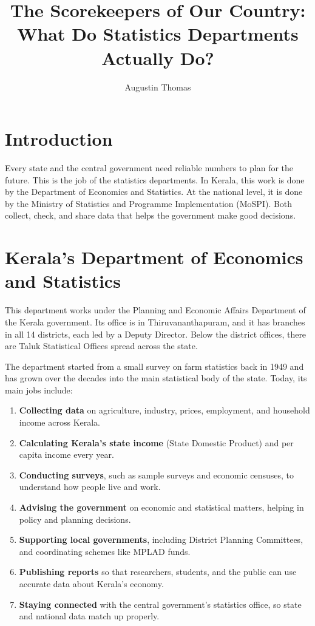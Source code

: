 \documentclass[12pt]{article}
\title{\textbf{\LARGE The Scorekeepers of Our Country:\\ \large What Do Statistics Departments Actually Do?}}
\author{Augustin Thomas}
\date{}
\begin{document}
 
\maketitle
 
\section*{Introduction}
Every state and the central government need reliable numbers to plan for the future. This is the job of the statistics departments. In Kerala, this work is done by the Department of Economics and Statistics. At the national level, it is done by the Ministry of Statistics and Programme Implementation (MoSPI). Both collect, check, and share data that helps the government make good decisions.
 
\section*{Kerala's Department of Economics and Statistics}
This department works under the Planning and Economic Affairs Department of the Kerala government. Its office is in Thiruvananthapuram, and it has branches in all 14 districts, each led by a Deputy Director. Below the district offices, there are Taluk Statistical Offices spread across the state.
 
The department started from a small survey on farm statistics back in 1949 and has grown over the decades into the main statistical body of the state. Today, its main jobs include:
 
\begin{enumerate}[leftmargin=*]
    \item \textbf{Collecting data} on agriculture, industry, prices, employment, and household income across Kerala.
    \item \textbf{Calculating Kerala's state income} (State Domestic Product) and per capita income every year.
    \item \textbf{Conducting surveys}, such as sample surveys and economic censuses, to understand how people live and work.
    \item \textbf{Advising the government} on economic and statistical matters, helping in policy and planning decisions.
    \item \textbf{Supporting local governments}, including District Planning Committees, and coordinating schemes like MPLAD funds.
    \item \textbf{Publishing reports} so that researchers, students, and the public can use accurate data about Kerala's economy.
    \item \textbf{Staying connected} with the central government's statistics office, so state and national data match up properly.
\end{enumerate}
 
\end{document}

